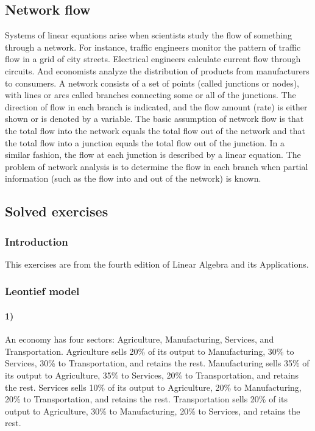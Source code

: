 \documentclass[oneside]{book} %
\theoremstyle{plain}
\begin{document}
\subsection{Network flow}
Systems of linear equations arise when scientists study the flow of something
through a network.
For instance, traffic engineers monitor the pattern of traffic flow in a grid of
city streets.
Electrical engineers calculate current flow through circuits.
And economists analyze the distribution of products from manufacturers to
consumers.
A network consists of a set of points (called junctions or nodes),
with lines or arcs called branches connecting some or all of the junctions.
The direction of flow in each branch is indicated,
and the flow amount (rate) is either shown or is denoted by a variable.
The basic assumption of network flow is that the total flow into the network
equals
the total flow out of the network and that the total flow into a junction equals
the total
flow out of the junction.
In a similar fashion, the flow at each junction is described by a linear
equation. The
problem of network analysis is to determine the flow in each branch when partial
information (such as the flow into and out of the network) is known.

\subsection{Solved exercises}
\subsubsection{Introduction}
This exercises are from the fourth edition of Linear Algebra and its
Applications.
\subsubsection{Leontief model}
\paragraph{1)}
An economy has four sectors: Agriculture, Manufacturing, Services, and
Transportation.
Agriculture sells 20\% of its output to Manufacturing, 30\% to Services, 30\% to
Transportation, and retains the rest.
Manufacturing sells 35\% of its output to Agriculture, 35\% to Services, 20\% to
Transportation, and retains the rest.
Services sells 10\% of its output to Agriculture, 20\% to Manufacturing, 20\% to
Transportation, and retains the rest.
Transportation sells 20\% of its output to Agriculture, 30\% to Manufacturing,
20\% to Services, and retains the rest.
\end{document}
